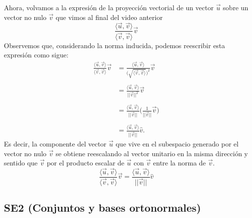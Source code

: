 \documentclass[12pt,dvipsnames]{article}
\numberwithin{equation}{section}
\begin{document}
Ahora, volvamos a la expresión de la proyección vectorial de un vector $\vec{u}$ sobre un vector no nulo $\vec{v}$ que vimos al final del video anterior
\[
\frac{\langle \vec{u} , \vec{v} \rangle}{\langle \vec{v} , \vec{v} \rangle} \vec{v} 
\] 
Observemos que, considerando la norma inducida, podemos reescribir esta expresión como sigue:
\begin{align*}
    \frac{\langle \vec{u} , \vec{v} \rangle}{\langle \vec{v} , \vec{v} \rangle} \vec{v} &= \frac{\langle \vec{u} , \vec{v} \rangle}{\big(\sqrt{\langle \vec{v} , \vec{v} \rangle}\big)^2} \vec{v} \\ \\
                                                                                        &= \frac{\langle \vec{u} , \vec{v} \rangle}{||\vec{v}||^2} \vec{v} \\ \\
                                                                                        &= \frac{\langle \vec{u} , \vec{v} \rangle}{||\vec{v}||} \bigg( \frac{1}{||\vec{v}||} \vec{v} \bigg) \\ \\
                                                                                        &= \frac{\langle \vec{u} , \vec{v} \rangle}{||\vec{v}||} \hat{v}.
\end{align*}
Es decir, la componente del vector $\vec{u}$ que vive en el subespacio generado por el vector no nulo $\vec{v}$ se obtiene reescalando al vector unitario en la misma dirección y sentido que $\vec{v}$ por el producto escalar de $\vec{u}$ con $\vec{v}$ entre la norma de $\vec{v}$.
\[
    \frac{\langle \vec{u} , \vec{v} \rangle}{\langle \vec{v} , \vec{v} \rangle} \vec{v} = \frac{\langle \vec{u} , \vec{v} \rangle}{||\vec{v}||} \hat{v}
\] 

\subsection{SE2 (Conjuntos y bases ortonormales)}
\end{document}
